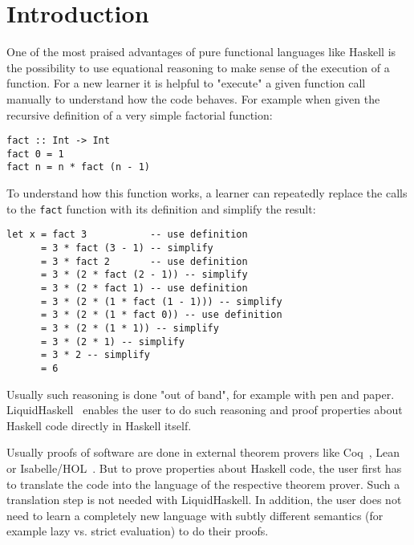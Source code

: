 \documentclass[acmlarge,screen,authorversion=true,nonacm=true]{acmart}
\begin{document}


\maketitle

\section{Introduction}\label{sec:introduction}

One of the most praised advantages of pure functional languages like Haskell is the possibility to use equational reasoning to make sense of the execution of a function. For a new learner it is helpful to "execute" a given function call manually to understand how the code behaves. For example when given the recursive definition of a very simple factorial function:

\begin{lstlisting}
fact :: Int -> Int
fact 0 = 1
fact n = n * fact (n - 1)
\end{lstlisting}

To understand how this function works, a learner can repeatedly replace the calls to the \texttt{fact} function with its definition and simplify the result:

\begin{lstlisting}
let x = fact 3           -- use definition
      = 3 * fact (3 - 1) -- simplify
      = 3 * fact 2       -- use definition
      = 3 * (2 * fact (2 - 1)) -- simplify
      = 3 * (2 * fact 1) -- use definition
      = 3 * (2 * (1 * fact (1 - 1))) -- simplify
      = 3 * (2 * (1 * fact 0)) -- use definition
      = 3 * (2 * (1 * 1)) -- simplify
      = 3 * (2 * 1) -- simplify
      = 3 * 2 -- simplify
      = 6
\end{lstlisting}

Usually such reasoning is done "out of band", for example with pen and paper. LiquidHaskell~\cite{liquidhaskell} enables the user to do such reasoning and proof properties about Haskell code directly in Haskell itself.

Usually proofs of software are done in external theorem provers like Coq~\cite{coq}, Lean~\cite{lean} or Isabelle/HOL~\cite{isabelle}. But to prove properties about Haskell code, the user first has to translate the code into the language of the respective theorem prover. Such a translation step is not needed with LiquidHaskell. In addition, the user does not need to learn a completely new language with subtly different semantics (for example lazy vs. strict evaluation) to do their proofs.
\end{document}
